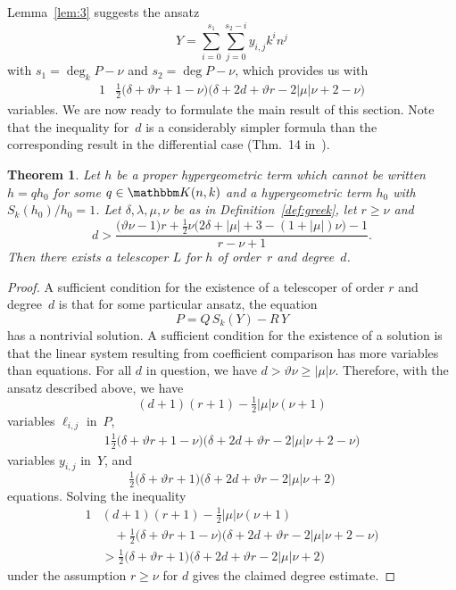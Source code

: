 \documentclass{sig-alternate}
\newtheorem{theorem}{Theorem}
\let\set\mathbbm
\def\K{\set K}
\def\deg{\operatorname{deg}}
\begin{document}
Lemma~\ref{lem:3} suggests the ansatz
\[
  Y = \sum_{i=0}^{s_1}\sum_{j=0}^{s_2-i} y_{i,j}k^i n^j
\]
with $s_1=\deg_k P-\nu$ and $s_2=\deg P-\nu$, which provides us with
\begin{alignat*}1
  &\tfrac12\bigl(\delta+\vartheta r+1-\nu\bigr)\bigl(\delta + 2d + \vartheta r - 2|\mu|\nu + 2-\nu\bigr)
\end{alignat*}
variables. We are now ready to formulate the main result of this section.
Note that the inequality for~$d$ is a considerably simpler formula
than the corresponding result in the differential case (Thm.~14 in~\cite{chen11}).

\begin{theorem}\label{thm:trans}
  Let $h$ be a proper hypergeometric term which cannot be written $h=qh_0$ for
  some $q\in\K(n,k)$ and a hypergeometric term $h_0$ with $S_k(h_0)/h_0=1$.
  Let $\delta,\lambda,\mu,\nu$ be as in Definition~\ref{def:greek}, let $r\geq\nu$ and
  \[
    d>\frac{\bigl(\vartheta\nu-1\bigr)r + \tfrac12\nu\bigl(2\delta+|\mu|+3-(1+|\mu|)\nu\bigr) - 1}{r-\nu+1}.
  \]
  Then there exists a telescoper $L$ for $h$ of order~$r$ and degree~$d$.
\end{theorem}
\begin{proof}
  A sufficient condition for the existence of a telescoper of order $r$ and degree~$d$ is that
  for some particular ansatz, the equation
  \[
    P=Q\,S_k(Y)-R\,Y
  \]
  has a nontrivial solution. A sufficient condition for the existence of a solution is that the
  linear system resulting from coefficient comparison has more variables than equations.
  For all $d$ in question, we have $d>\vartheta\nu\geq|\mu|\nu$. Therefore,
  with the ansatz described above, we have
  \[
    (d+1)(r+1)-\tfrac12|\mu|\nu(\nu+1)
  \]
  variables $\ell_{i,j}$ in~$P$,
  \begin{alignat*}1
    \tfrac12\bigl(\delta+\vartheta r+1-\nu\bigr)\bigl(\delta + 2d + \vartheta r - 2|\mu|\nu + 2-\nu\bigr)
  \end{alignat*}
  variables $y_{i,j}$ in~$Y$, and
  \[
    \tfrac12\bigl(\delta+\vartheta r+1\bigr)\bigl(\delta + 2d + \vartheta r - 2|\mu|\nu + 2\bigr)
  \]
  equations. Solving the inequality
  \begin{alignat*}1
    &(d+1)(r+1)-\tfrac12|\mu|\nu(\nu+1)\\
    &\quad{}+\tfrac12\bigl(\delta+\vartheta r+1-\nu\bigr)\bigl(\delta + 2d + \vartheta r - 2|\mu|\nu + 2-\nu\bigr)\\
    &>\tfrac12\bigl(\delta+\vartheta r+1\bigr)\bigl(\delta + 2d + \vartheta r - 2|\mu|\nu + 2\bigr)
  \end{alignat*}
  under the assumption $r\geq\nu$ for $d$ gives the claimed degree estimate.
\end{proof}
\end{document}
